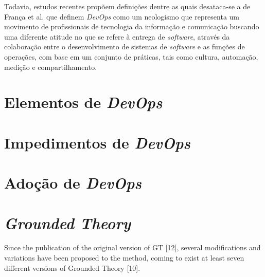 Todavia, estudos recentes propõem definições
dentre as quais desataca-se a de França et al. \cite{characterizing_devops}
que definem \textit{DevOps} como um neologismo que representa um movimento de
profissionais de tecnologia da informação e comunicação buscando uma
diferente atitude no que se refere à entrega de \textit{software},
através da colaboração entre o desenvolvimento de sistemas de
\textit{software} e as funções de operações, com base em um conjunto
de práticas, tais como cultura, automação, medição e compartilhamento.

\section{Elementos de \textit{DevOps}}

\section{Impedimentos de \textit{DevOps}}

\section{Adoção de \textit{DevOps}}

\section{\textit{Grounded Theory}}
Since the publication of the original version of GT [12], several
modifications and variations have been proposed to the method,
coming to exist at least seven different versions of Grounded Theory [10].



